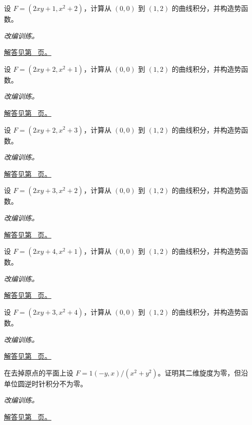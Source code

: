 \documentclass[12pt,fontset=fandol]{ctexart}
\begin{document}
\begin{example}[势函数与路径无关]\label{ex:c41q14}
设 $F=(2xy+1,x^2+2)$，计算从 $(0,0)$ 到 $(1,2)$ 的曲线积分，并构造势函数。
\par\textit{改编训练。}\par\hyperref[ans:c41q14]{解答见第~\pageref{ans:c41q14} 页。}
\end{example}
\begin{example}[势函数与路径无关]\label{ex:c41q15}
设 $F=(2xy+2,x^2+1)$，计算从 $(0,0)$ 到 $(1,2)$ 的曲线积分，并构造势函数。
\par\textit{改编训练。}\par\hyperref[ans:c41q15]{解答见第~\pageref{ans:c41q15} 页。}
\end{example}
\begin{example}[势函数与路径无关]\label{ex:c41q16}
设 $F=(2xy+2,x^2+3)$，计算从 $(0,0)$ 到 $(1,2)$ 的曲线积分，并构造势函数。
\par\textit{改编训练。}\par\hyperref[ans:c41q16]{解答见第~\pageref{ans:c41q16} 页。}
\end{example}
\begin{example}[势函数与路径无关]\label{ex:c41q17}
设 $F=(2xy+3,x^2+2)$，计算从 $(0,0)$ 到 $(1,2)$ 的曲线积分，并构造势函数。
\par\textit{改编训练。}\par\hyperref[ans:c41q17]{解答见第~\pageref{ans:c41q17} 页。}
\end{example}
\begin{example}[势函数与路径无关]\label{ex:c41q18}
设 $F=(2xy+4,x^2+1)$，计算从 $(0,0)$ 到 $(1,2)$ 的曲线积分，并构造势函数。
\par\textit{改编训练。}\par\hyperref[ans:c41q18]{解答见第~\pageref{ans:c41q18} 页。}
\end{example}
\begin{example}[势函数与路径无关]\label{ex:c41q19}
设 $F=(2xy+3,x^2+4)$，计算从 $(0,0)$ 到 $(1,2)$ 的曲线积分，并构造势函数。
\par\textit{改编训练。}\par\hyperref[ans:c41q19]{解答见第~\pageref{ans:c41q19} 页。}
\end{example}
\begin{example}[有孔区域与无旋场]\label{ex:c41q20}
在去掉原点的平面上设 $F=1(-y,x)/(x^2+y^2)$。证明其二维旋度为零，但沿单位圆逆时针积分不为零。
\par\textit{改编训练。}\par\hyperref[ans:c41q20]{解答见第~\pageref{ans:c41q20} 页。}
\end{example}
\end{document}
